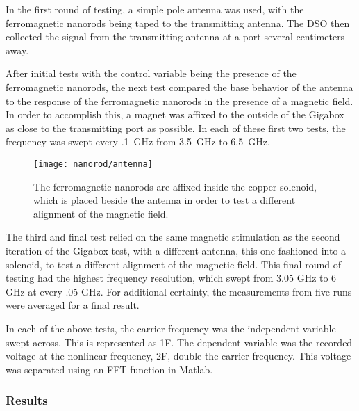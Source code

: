 In the first round of testing, a simple pole antenna was used, with the ferromagnetic nanorods being taped to the transmitting antenna. The DSO then collected the signal from the transmitting antenna at a port several centimeters away.

After initial tests with the control variable being the presence of the ferromagnetic nanorods, the next test compared the base behavior of the antenna to the response of the ferromagnetic nanorods in the presence of a magnetic field. In order to accomplish this, a magnet was affixed to the outside of the Gigabox as close to the transmitting port as possible. In each of these first two tests, the frequency was swept every .1~GHz from 3.5~GHz to 6.5~GHz.

\begin{figure}[h!]
\centering
\texttt{[image: nanorod/antenna]}
    \caption[Antenna used with ferromagnetic nanorods in the Gigabox]{The ferromagnetic nanorods are affixed inside the copper solenoid, which is placed beside the antenna in order to test a different alignment of the magnetic field.}
    \label{fig:nanorod-setup}
\end{figure}

The third and final test relied on the same magnetic stimulation as the second iteration of the Gigabox test, with a different antenna, this one fashioned into a solenoid, to test a different alignment of the magnetic field. This final round of testing had the highest frequency resolution, which swept from 3.05 GHz to 6 GHz at every .05 GHz. For additional certainty, the measurements from five runs were averaged for a final result.

In each of the above tests, the carrier frequency was the independent variable swept across. This is represented as 1F. The dependent variable was the recorded voltage at the nonlinear frequency, 2F, double the carrier frequency. This voltage was separated using an FFT function in Matlab.

\subsubsection{Results}

